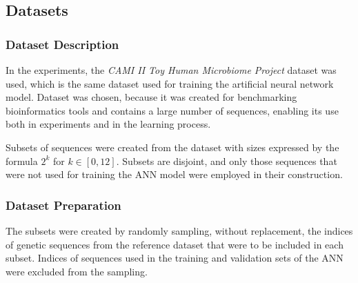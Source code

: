 \documentclass[pdflatex,sn-vancouver-num]{sn-jnl}%
\begin{document}


        \subsection{Datasets}
            \subsubsection{Dataset Description}
                In the experiments, the \textit{CAMI II Toy Human Microbiome Project}\cite{Fritz:2019} dataset was used, which is the same dataset used for training the artificial neural network model. Dataset was chosen, because it was created for benchmarking bioinformatics tools and contains a large number of sequences, enabling its use both in experiments and in the learning process.

                Subsets of sequences were created from the dataset with sizes expressed by the formula $2^k$ for $k \in [0, 12]$. Subsets are disjoint, and only those sequences that were not used for training the ANN model were employed in their construction.

            \subsubsection{Dataset Preparation}
                The subsets were created by randomly sampling, without replacement, the indices of genetic sequences from the reference dataset that were to be included in each subset. Indices of sequences used in the training and validation sets of the ANN were excluded from the sampling.
\end{document}
